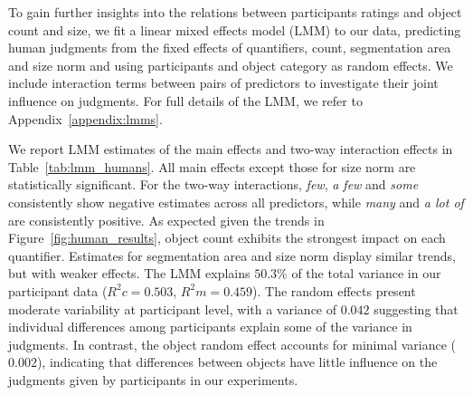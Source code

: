 To gain further insights into the relations between participants ratings and object count and size, we fit a linear mixed effects model (LMM) to our data, predicting human judgments from the fixed effects of
quantifiers, count, segmentation area and size norm
and using participants and object category as random effects. 
We include interaction terms between pairs of predictors to investigate their joint influence on judgments.
For full details of the LMM, we refer to Appendix~\ref{appendix:lmms}. 

We report LMM estimates of the main effects and two-way interaction effects in Table~\ref{tab:lmm_humans}. 
All main effects except those for size norm are statistically significant.
For the two-way interactions, \textit{few}, \textit{a few} and \textit{some} consistently show negative estimates across all predictors, while \textit{many} and \textit{a lot of} are consistently positive. As expected given the trends in Figure~\ref{fig:human_results}, object count exhibits the strongest impact on each quantifier. 
Estimates for segmentation area and size norm display similar trends, but with weaker effects.
The LMM explains $50.3\%$ of the total variance in our participant data ($R^2c = 0.503$, $R^2m = 0.459$).
The random effects present moderate variability at participant level, with a variance of $0.042$
suggesting that individual differences among participants explain some of the variance in judgments.
In contrast, the object random effect accounts for minimal variance ($0.002$),
indicating that differences between objects have little influence on the judgments given by participants in our experiments. 